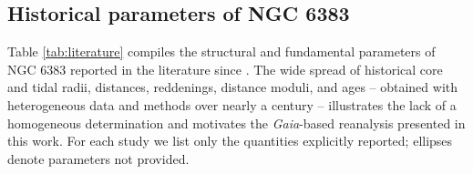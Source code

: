 \documentclass{aa}
\begin{document}
\begin{appendix}

\section{Historical parameters of NGC 6383}\label{app:historical}

Table \ref{tab:literature} compiles the structural and fundamental parameters of NGC 6383 reported in the literature since \citet{1930LicOB..14..154T}. The wide spread of historical core and tidal radii, distances, reddenings, distance moduli, and ages -- obtained with heterogeneous data and methods over nearly a century -- illustrates the lack of a homogeneous determination and motivates the \textit{Gaia}-based reanalysis presented in this work. For each study we list only the quantities explicitly reported; ellipses denote parameters not provided.


\end{appendix}
\end{document}
